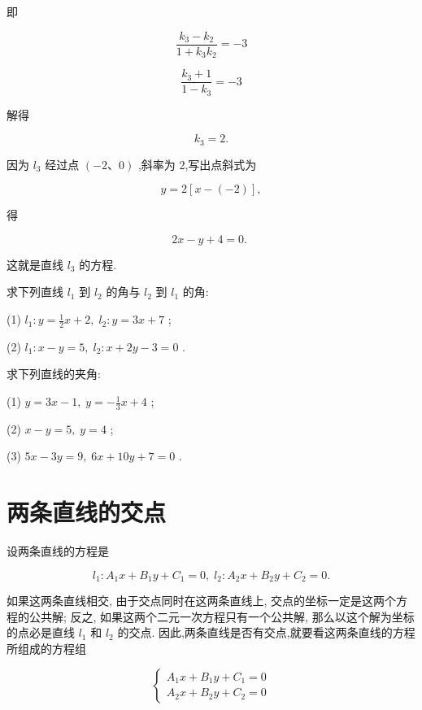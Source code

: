 \documentclass[lang=cn,newtx,10pt,scheme=chinese]{elegantbook}
\begin{document}
即

\[
  \frac{{k}_{3} - {k}_{2}}{1 + {k}_{3}{k}_{2}} = - 3
\]

\[
  \frac{{k}_{3} + 1}{1 - {k}_{3}} = - 3
\]

解得

\[
    {k}_{3} = 2\text{.}
\]

因为 \({l}_{3}\) 经过点 \(\left( {-2\text{、}0}\right)\) ,斜率为 2,写出点斜式为

\[
  y = 2\left\lbrack {x - \left( {-2}\right) }\right\rbrack ,
\]

得

\[
    {2x} - y + 4 = 0\text{. }
\]

这就是直线 \({l}_{3}\) 的方程.

\begin{problemset}[练习]

\item 求下列直线 \({l}_{1}\) 到 \({l}_{2}\) 的角与 \({l}_{2}\) 到 \({l}_{1}\) 的角:

(1) \({l}_{1} : y = \frac{1}{2}x + 2,\;{l}_{2} : y = {3x} + 7\) ;

(2) \({l}_{1} : x - y = 5,\;{l}_{2} : x + {2y} - 3 = 0\) .

\item 求下列直线的夹角:

(1) \(y = {3x} - 1,\;y = - \frac{1}{3}x + 4\) ;

(2) \(x - y = 5,\;y = 4\) ;

(3) \({5x} - {3y} = 9,\;{6x} + {10y} + 7 = 0\) .
\end{problemset}

\section{两条直线的交点}

设两条直线的方程是

\[
    {l}_{1} : {A}_{1}x + {B}_{1}y + {C}_{1} = 0,\;{l}_{2} : {A}_{2}x + {B}_{2}y + {C}_{2} = 0.
\]

如果这两条直线相交, 由于交点同时在这两条直线上, 交点的坐标一定是这两个方程的公共解; 反之, 如果这两个二元一次方程只有一个公共解, 那么以这个解为坐标的点必是直线 \({l}_{1}\) 和 \({l}_{2}\) 的交点. 因此,两条直线是否有交点,就要看这两条直线的方程所组成的方程组

\[
  \left\{ \begin{array}{l} {A}_{1}x + {B}_{1}y + {C}_{1} = 0 \\ {A}_{2}x + {B}_{2}y + {C}_{2} = 0 \end{array}\right. \tag{1 2}
\]
\end{document}
